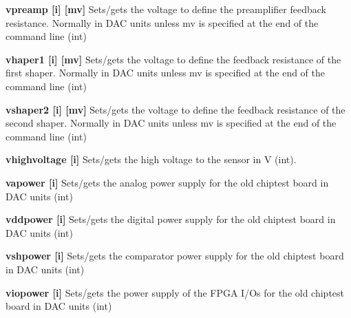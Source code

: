\begin{DoxyItemize}
\item {\bfseries vpreamp \mbox{[}i\mbox{]} \mbox{[}mv\mbox{]}} Sets/gets the voltage to define the preamplifier feedback resistance. Normally in DAC units unless {\ttfamily mv} is specified at the end of the command line (int)
\end{DoxyItemize}


\begin{DoxyItemize}
\item {\bfseries vhaper1 \mbox{[}i\mbox{]} \mbox{[}mv\mbox{]}} Sets/gets the voltage to define the feedback resistance of the first shaper. Normally in DAC units unless {\ttfamily mv} is specified at the end of the command line (int)
\end{DoxyItemize}


\begin{DoxyItemize}
\item {\bfseries vshaper2 \mbox{[}i\mbox{]} \mbox{[}mv\mbox{]}} Sets/gets the voltage to define the feedback resistance of the second shaper. Normally in DAC units unless {\ttfamily mv} is specified at the end of the command line (int)
\end{DoxyItemize}


\begin{DoxyItemize}
\item {\bfseries vhighvoltage \mbox{[}i\mbox{]}} Sets/gets the high voltage to the sensor in V (int).
\end{DoxyItemize}


\begin{DoxyItemize}
\item {\bfseries vapower \mbox{[}i\mbox{]}} Sets/gets the analog power supply for the old chiptest board in DAC units (int)
\end{DoxyItemize}


\begin{DoxyItemize}
\item {\bfseries vddpower \mbox{[}i\mbox{]}} Sets/gets the digital power supply for the old chiptest board in DAC units (int)
\end{DoxyItemize}


\begin{DoxyItemize}
\item {\bfseries vshpower \mbox{[}i\mbox{]}} Sets/gets the comparator power supply for the old chiptest board in DAC units (int)
\end{DoxyItemize}


\begin{DoxyItemize}
\item {\bfseries viopower \mbox{[}i\mbox{]}} Sets/gets the power supply of the FPGA I/Os for the old chiptest board in DAC units (int)
\end{DoxyItemize}


